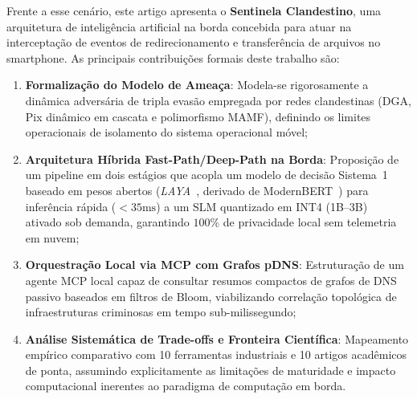 Frente a esse cen\'{a}rio, este artigo apresenta o \textbf{Sentinela Clandestino}, uma arquitetura de intelig\^{e}ncia artificial na borda concebida para atuar na intercepta\c{c}\~{a}o de eventos de redirecionamento e transfer\^{e}ncia de arquivos no smartphone. As principais contribui\c{c}\~{o}es formais deste trabalho s\~{a}o:
\begin{enumerate}
    \item \textbf{Formaliza\c{c}\~{a}o do Modelo de Amea\c{c}a}: Modela-se rigorosamente a din\^{a}mica advers\'{a}ria de tripla evas\~{a}o empregada por redes clandestinas (DGA, Pix din\^{a}mico em cascata e polimorfismo MAMF), definindo os limites operacionais de isolamento do sistema operacional m\'{o}vel;
    \item \textbf{Arquitetura H\'{i}brida Fast-Path/Deep-Path na Borda}: Proposi\c{c}\~{a}o de um pipeline em dois est\'{a}gios que acopla um modelo de decis\~{a}o Sistema~1 baseado em pesos abertos (\textit{LAYA}~\cite{convai2026laya}, derivado de ModernBERT~\cite{warner2024modernbert}) para infer\^{e}ncia r\'{a}pida ($< 35\text{ms}$) a um SLM quantizado em INT4 (1B--3B)~\cite{liu2024mobilellm} ativado sob demanda, garantindo $100\%$ de privacidade local sem telemetria em nuvem;
    \item \textbf{Orquestra\c{c}\~{a}o Local via MCP com Grafos pDNS}: Estrutura\c{c}\~{a}o de um agente MCP local capaz de consultar resumos compactos de grafos de DNS passivo baseados em filtros de Bloom, viabilizando correla\c{c}\~{a}o topol\'{o}gica de infraestruturas criminosas em tempo sub-milissegundo;
    \item \textbf{An\'{a}lise Sistem\'{a}tica de Trade-offs e Fronteira Cient\'{i}fica}: Mapeamento emp\'{i}rico comparativo com 10 ferramentas industriais e 10 artigos acad\^{e}micos de ponta, assumindo explicitamente as limita\c{c}\~{o}es de maturidade e impacto computacional inerentes ao paradigma de computa\c{c}\~{a}o em borda.
\end{enumerate}